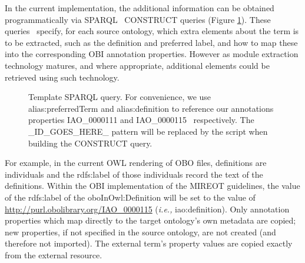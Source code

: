 \documentclass{ao2e}%
\begin{document}
In the current implementation, the additional information can be obtained programmatically via SPARQL~\cite{SPARQL} CONSTRUCT queries (Figure \ref{fig:sparql}).
These queries~\cite{OBIQueries} specify, for each source ontology, which extra elements about the term is to be extracted, such as the definition and preferred label, and how to map these into the corresponding OBI annotation properties. However as module extraction technology matures, and where appropriate, additional elements could be retrieved using such technology.

\begin{figure}[t]
\scriptsize
 
\caption{Template SPARQL query. For convenience, we use alias:preferredTerm and
alias:definition to reference our annotations properties IAO\_0000111 and IAO\_0000115~\cite{IAO} respectively. The \_ID\_GOES\_HERE\_ pattern will be replaced by the script when building the CONSTRUCT query.}
\label{fig:sparql}
\end{figure}

For example, in the current \ac{OWL} rendering of \ac{OBO} files, definitions are individuals and the rdfs:label of those individuals record the text of the definitions. 
Within the \ac{OBI} implementation of the \ac{MIREOT} guidelines, the value of the rdfs:label of the oboInOwl:Definition will be set to the value of \url{http://purl.obolibrary.org/IAO_0000115} (\emph{i.e.,} iao:definition). Only annotation properties which map directly to the target ontology's own metadata are copied; new properties, if not specified in the source ontology, are not created (and therefore not imported). The external term's property values are copied exactly from the external resource.
\end{document}
